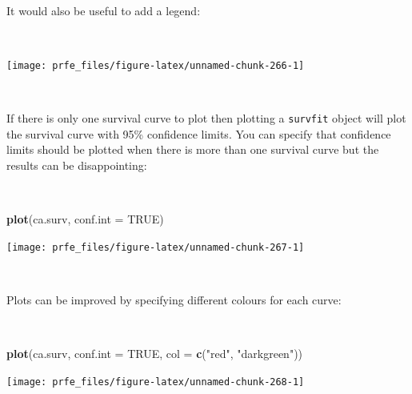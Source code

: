 \documentclass[12pt,a4paper]{book}
\newenvironment{Shaded}{\begin{snugshade}}{\end{snugshade}}
\newcommand{\KeywordTok}[1]{\textcolor[rgb]{0.13,0.29,0.53}{\textbf{#1}}}
\newcommand{\DataTypeTok}[1]{\textcolor[rgb]{0.13,0.29,0.53}{#1}}
\newcommand{\DecValTok}[1]{\textcolor[rgb]{0.00,0.00,0.81}{#1}}
\newcommand{\StringTok}[1]{\textcolor[rgb]{0.31,0.60,0.02}{#1}}
\newcommand{\OtherTok}[1]{\textcolor[rgb]{0.56,0.35,0.01}{#1}}
\newcommand{\OperatorTok}[1]{\textcolor[rgb]{0.81,0.36,0.00}{\textbf{#1}}}
\newcommand{\NormalTok}[1]{#1}
\theoremstyle{definition}
\theoremstyle{definition}
\theoremstyle{definition}
\theoremstyle{remark}
\begin{document}
~

It would also be useful to add a legend:

~

\begin{Shaded}
\end{Shaded}

\begin{center}\texttt{[image: prfe\_files/figure-latex/unnamed-chunk-266-1]} \end{center}

~

If there is only one survival curve to plot then plotting a
\texttt{survfit} object will plot the survival curve with 95\%
confidence limits. You can specify that confidence limits should be
plotted when there is more than one survival curve but the results can
be disappointing:

~

\begin{Shaded}
\begin{Highlighting}[]
\KeywordTok{plot}\NormalTok{(ca.surv, }\DataTypeTok{conf.int =} \OtherTok{TRUE}\NormalTok{)}
\end{Highlighting}
\end{Shaded}

\begin{center}\texttt{[image: prfe\_files/figure-latex/unnamed-chunk-267-1]} \end{center}

~

Plots can be improved by specifying different colours for each curve:

~

\begin{Shaded}
\begin{Highlighting}[]
\KeywordTok{plot}\NormalTok{(ca.surv, }\DataTypeTok{conf.int =} \OtherTok{TRUE}\NormalTok{, }\DataTypeTok{col =} \KeywordTok{c}\NormalTok{(}\StringTok{"red"}\NormalTok{, }\StringTok{"darkgreen"}\NormalTok{))}
\end{Highlighting}
\end{Shaded}

\begin{center}\texttt{[image: prfe\_files/figure-latex/unnamed-chunk-268-1]} \end{center}
\end{document}
